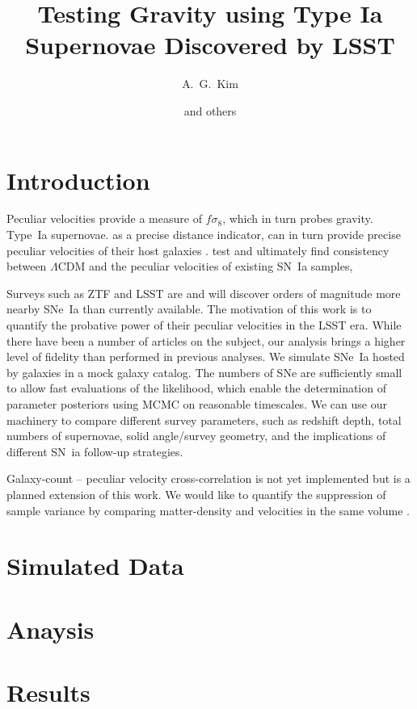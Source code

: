 \documentclass{aastex62}   	%
\begin{document}
\title{Testing Gravity using Type Ia Supernovae Discovered by LSST}
\author[0000-0001-6315-8743]{A.~G.~Kim}
    
\author{and others}



\maketitle
\section{Introduction}
Peculiar velocities provide a measure of $f\sigma_8$, which in turn probes gravity.  Type~Ia supernovae. as a precise distance indicator,
can in turn  provide precise peculiar velocities of their host galaxies \citep{2006PhRvD..73l3526H,2011ApJ...741...67D}.
\citet{2015JCAP...12..033H, 2017JCAP...05..015H}  test and ultimately find consistency between
$\Lambda$CDM and the peculiar velocities of existing SN~Ia samples,

Surveys such as ZTF and LSST are and will discover orders of magnitude more nearby SNe~Ia than currently available.
The motivation of this work is to quantify the probative power of their peculiar velocities in the LSST era.
While there have been a number of articles on the subject,
our analysis brings a higher level of fidelity than performed in previous analyses.  We simulate SNe~Ia hosted by galaxies in a mock galaxy
catalog. The numbers of SNe are sufficiently small to allow fast evaluations of the likelihood, which enable the determination of parameter
posteriors using MCMC on reasonable timescales.   We can use our machinery to 
compare different survey parameters, such as redshift depth, total numbers of supernovae,
solid angle/survey geometry, and the implications of different SN~ia follow-up strategies.

Galaxy-count -- peculiar velocity cross-correlation is not yet implemented but is a planned extension of this work.  We would like to
quantify the suppression of sample variance by comparing matter-density and velocities in the same volume \citep{2007PhRvL..99h1301G}.

\section{Simulated Data}

\section{Anaysis}

\section{Results}



\end{document}
